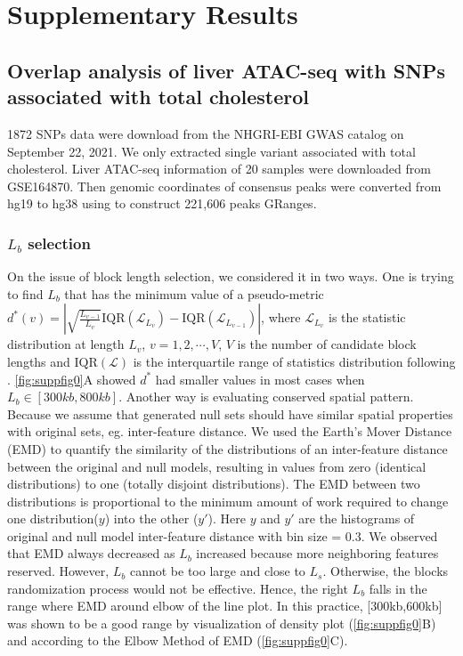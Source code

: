 \documentclass{article}
\begin{document}
\section{Supplementary Results} \label{sec:results}
\subsection{Overlap analysis of liver ATAC-seq with SNPs associated with
total cholesterol}
1872 SNPs data were download from the NHGRI-EBI GWAS catalog \citep{gwascatalog} on September 22, 2021. We only extracted single variant  associated with total cholesterol. Liver ATAC-seq
\citep{CURRIN20211169} information of 20 samples were downloaded from GSE164870.
Then genomic coordinates of consensus peaks were converted from hg19 to hg38 using  to construct 221,606 peaks GRanges.

\subsubsection{$L_b$ selection}\label{sec:length}
On the issue of 
block length selection, we considered it in two ways. 
One is trying to find $L_b$ that has the minimum value of a pseudo-metric $d^*(v)=|\sqrt{\frac{L_{v-1}}{L_v}}\text{IQR}(\mathcal{L}_{L_v})-\text{IQR}(\mathcal{L}_{L_{v-1}})|$, 
where $\mathcal{L}_{L_v}$ is the statistic distribution at length $L_v$, $v=1,2,\cdots,V$, $V$ is the number of candidate block lengths and $\text{IQR}(\mathcal{L})$ is the interquartile range of statistics distribution following \citet{bickel2010subsampling}. \cref{fig:suppfig0}A showed $d^*$ had smaller values in most cases when $L_b\in[300kb,800kb]$. 
Another way is evaluating conserved spatial pattern. Because we assume that generated null sets should have similar spatial properties with original sets, eg. inter-feature distance. 
We used the Earth's Mover Distance (EMD) to quantify the similarity of the distributions of an inter-feature distance between the original  and  null  models,  resulting  in  values  from  zero  (identical  distributions)  to  one  (totally  disjoint  distributions). 
The EMD between two distributions is proportional to the minimum amount of work required to change one distribution($y$) into the other ($y'$). 
Here $y$ and $y'$ are the histograms of original and null model inter-feature distance with bin size = 0.3. We observed that EMD always decreased as $L_b$ increased because more neighboring features reserved. However, $L_b$ cannot be too large and close to $L_s$. Otherwise, the blocks randomization process would not be effective. Hence, the right $L_b$ falls in the range where EMD around elbow of the line plot. In this practice, [300kb,600kb] was shown to be  a good range by visualization of density plot (\cref{fig:suppfig0}B) and according to the Elbow Method of EMD (\cref{fig:suppfig0}C). 
\end{document}
